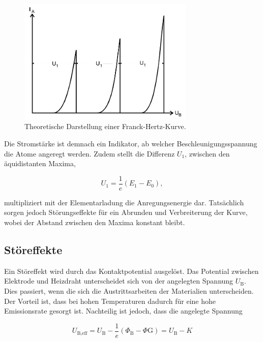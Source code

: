 \begin{figure}[H]
  \centering
  \includegraphics[height=6cm]{ressources/kurve1.png}
  \caption{Theoretische Darstellung einer Franck-Hertz-Kurve. \cite{skript}}
  \label{fig:2}
\end{figure}

Die Stromstärke ist demnach ein Indikator, ab welcher Beschleunigungsspannung die Atome angeregt werden.
Zudem stellt die Differenz $U_1$, zwischen den äquidistanten Maxima,

\begin{equation}
  U_1 = \frac{1}{e}(E_1-E_0), \label{eqn:5}
\end{equation}

multipliziert mit der Elementarladung die Anregungsenergie dar.
Tatsächlich sorgen jedoch Störungseffekte für ein Abrunden und Verbreiterung der Kurve, wobei der Abstand zwischen den Maxima konstant bleibt.

\subsection{Störeffekte}

Ein Störeffekt wird durch das Kontaktpotential ausgelöst.
Das Potential zwischen Elektrode und Heizdraht unterscheidet sich von der angelegten Spannung $U_{\text{B}}$.
Dies passiert, wenn die sich die Austrittsarbeiten der Materialien unterscheiden.
Der Vorteil ist, dass bei hohen Temperaturen dadurch für eine hohe Emissionsrate gesorgt ist.
Nachteilig ist jedoch, dass die angelegte Spannung

\begin{equation}
  U_{\text{B,eff}} = U_{\text{B}} - \frac{1}{e}(\Phi_{\text{B}} - \Phi{\text{G}}) = U_{\text{B}} - K \label{eqn:6}
\end{equation}

